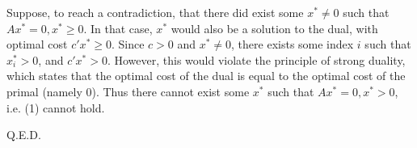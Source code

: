 Suppose, to reach a contradiction, that there did exist some $x^*\neq 0$ such that $Ax^*=0, x^*\geq 0$. In that case, $x^*$ would also be a solution to the dual, with optimal cost $c'x^*\geq 0$. Since $c>0$ and $x^*\neq 0$, there exists some index $i$ such that $x^*_i>0$, and $c'x^*>0$. However, this would violate the principle of strong duality, which states that the optimal cost of the dual is equal to the optimal cost of the primal (namely $0$). Thus there cannot exist some $x^*$ such that $Ax^*=0, x^*>0$, i.e. (1) cannot hold.

Q.E.D.